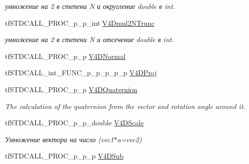 \begin{DoxyCompactItemize}
\begin{DoxyCompactList}\small\item\em умножение на 2 в степени N и округление double в int. \end{DoxyCompactList}\item 
\hypertarget{structs_functions_vector_c_p_u_a9dcede9d8ac87d4c60b03c231ea4c4bc}{tf\-S\-T\-D\-C\-A\-L\-L\-\_\-\-P\-R\-O\-C\-\_\-p\-\_\-p\-\_\-int \hyperlink{structs_functions_vector_c_p_u_a9dcede9d8ac87d4c60b03c231ea4c4bc}{V4\-Dmul2\-N\-Trunc}}\label{structs_functions_vector_c_p_u_a9dcede9d8ac87d4c60b03c231ea4c4bc}

\begin{DoxyCompactList}\small\item\em умножение на 2 в степени N и отсечение double в int. \end{DoxyCompactList}\item 
tf\-S\-T\-D\-C\-A\-L\-L\-\_\-\-P\-R\-O\-C\-\_\-p\-\_\-p \hyperlink{structs_functions_vector_c_p_u_a98a1148596cf2d02c35bf6d84c332121}{V4\-D\-Normal}
\item 
tf\-S\-T\-D\-C\-A\-L\-L\-\_\-int\-\_\-\-F\-U\-N\-C\-\_\-p\-\_\-p\-\_\-p\-\_\-p\-\_\-p \hyperlink{structs_functions_vector_c_p_u_a3e79123948ccc18427d3a66e0b51105a}{V4\-D\-Proj}
\item 
\hypertarget{structs_functions_vector_c_p_u_af99f4d759859bf838cc5294ef7b95660}{tf\-S\-T\-D\-C\-A\-L\-L\-\_\-\-P\-R\-O\-C\-\_\-p\-\_\-p \hyperlink{structs_functions_vector_c_p_u_af99f4d759859bf838cc5294ef7b95660}{V4\-D\-Quaternion}}\label{structs_functions_vector_c_p_u_af99f4d759859bf838cc5294ef7b95660}

\begin{DoxyCompactList}\small\item\em The calculation of the quaternion from the vector and rotation angle around it. \end{DoxyCompactList}\item 
\hypertarget{structs_functions_vector_c_p_u_adc7cd45120cb286433d0bf05d55b41ae}{tf\-S\-T\-D\-C\-A\-L\-L\-\_\-\-P\-R\-O\-C\-\_\-p\-\_\-p\-\_\-double \hyperlink{structs_functions_vector_c_p_u_adc7cd45120cb286433d0bf05d55b41ae}{V4\-D\-Scale}}\label{structs_functions_vector_c_p_u_adc7cd45120cb286433d0bf05d55b41ae}

\begin{DoxyCompactList}\small\item\em Умножение вектора на число (vec1$\ast$a=vec2) \end{DoxyCompactList}\item 
\hypertarget{structs_functions_vector_c_p_u_a4f56b3c2bd2c1715a64be5e362b46e9e}{tf\-S\-T\-D\-C\-A\-L\-L\-\_\-\-P\-R\-O\-C\-\_\-p\-\_\-p\-\_\-p \hyperlink{structs_functions_vector_c_p_u_a4f56b3c2bd2c1715a64be5e362b46e9e}{V4\-D\-Sub}}\label{structs_functions_vector_c_p_u_a4f56b3c2bd2c1715a64be5e362b46e9e}


\end{DoxyCompactItemize}
